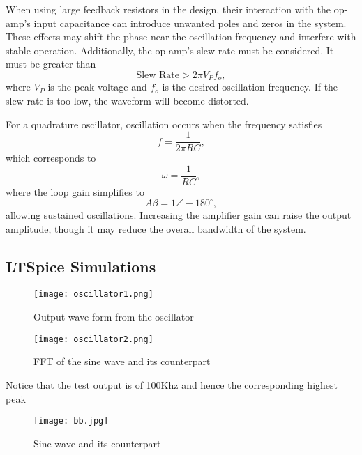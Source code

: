 \documentclass[conference]{IEEEtran}
\begin{document}
When using large feedback resistors in the design, their interaction with the op-amp’s input capacitance can introduce unwanted poles and zeros in the system. These effects may shift the phase near the oscillation frequency and interfere with stable operation. Additionally, the op-amp's slew rate must be considered. It must be greater than
\[
\text{Slew Rate} > 2\pi V_P f_o,
\]
where \( V_P \) is the peak voltage and \( f_o \) is the desired oscillation frequency. If the slew rate is too low, the waveform will become distorted.

For a quadrature oscillator, oscillation occurs when the frequency satisfies
\[
f = \frac{1}{2\pi RC},
\]
which corresponds to
\[
\omega = \frac{1}{RC},
\]
where the loop gain simplifies to
\[
A\beta = 1 \angle -180^\circ,
\]
allowing sustained oscillations. Increasing the amplifier gain can raise the output amplitude, though it may reduce the overall bandwidth of the system.

\subsection{LTSpice Simulations}

\begin{figure}[H]
    \centering
    \texttt{[image: oscillator1.png]}
    \caption{Output wave form from the oscillator}
\end{figure}

\begin{figure}[H]
    \centering
    \texttt{[image: oscillator2.png]}
    \caption{FFT of the sine wave and its counterpart}
\end{figure}
Notice that the test output is of 100Khz and hence the corresponding highest peak

\begin{figure}[H]
    \centering
    \texttt{[image: bb.jpg]}
    \caption{Sine wave and its counterpart}
\end{figure}
\end{document}
